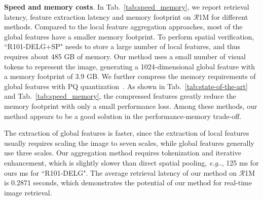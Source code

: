 \documentclass[letterpaper]{article} \usepackage{aaai22}  \usepackage{times}  \usepackage{helvet}  \usepackage{courier}  \usepackage[hyphens]{url}  \usepackage{graphicx} \urlstyle{rm} \def\UrlFont{\rm}  \usepackage{natbib}  \usepackage{caption} \DeclareCaptionStyle{ruled}{labelfont=normalfont,labelsep=colon,strut=off} \frenchspacing  \setlength{\pdfpagewidth}{8.5in}  \setlength{\pdfpageheight}{11in}  \usepackage{algorithm}
\makeatletter
\DeclareRobustCommand\onedot{\futurelet\@let@token\@onedot}
\def\@onedot{\ifx\@let@token.\else.\null\fi\xspace}
\def\eg{\emph{e.g}\onedot} \def\Eg{\emph{E.g}\onedot}
\makeatother
\begin{document}
\noindent\textbf{Speed and memory costs}.
In Tab.~\ref{tab:speed_memory}, we report retrieval latency, feature extraction latency and memory footprint on $\mathcal{R}$1M for different methods.
Compared to the local feature aggregation approaches, most of the global features have a smaller memory footprint.
To perform spatial verification, ``R101-DELG+SP" needs to store a large number of local features, and thus requires about 485 GB of memory.
Our method uses a small number of visual tokens to represent the image, generating a 1024-dimensional global feature with a memory footprint of 3.9 GB. We further compress the memory requirements of global features with PQ quantization~\cite{PQ}.
As shown in Tab.~\ref{tab:state-of-the-art} and Tab.~\ref{tab:speed_memory},  the compressed features greatly reduce the memory footprint with only a small performance loss. 
Among these methods, our method appears to be a good solution in the performance-memory trade-off.

The extraction of global features is faster, since the extraction of local features usually requires scaling the image to seven scales, while global features generally use three scales.
Our aggregation method requires tokenization and iterative enhancement, which is slightly slower than direct spatial pooling, \eg, 125 ms for ours  ms for ``R101-DELG". 
The average retrieval latency of our method on $\mathcal{R}$1M is 0.2871 seconds, which demonstrates the potential of our method for real-time image retrieval.
\end{document}
